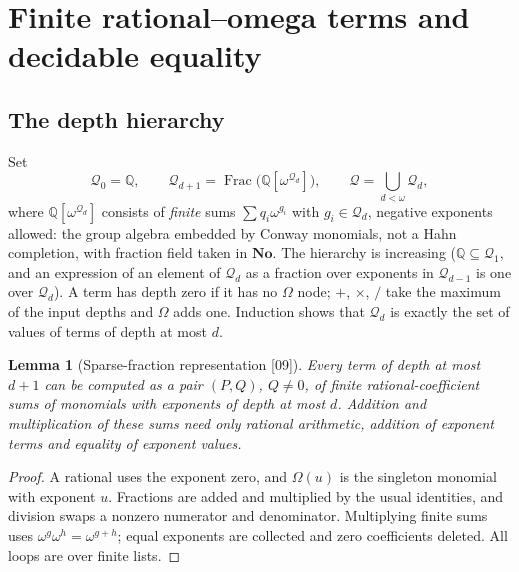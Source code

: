 \documentclass[11pt,oneside]{article}
\numberwithin{equation}{section}
\newtheorem{lemma}[lemma]{Lemma}
\theoremstyle{definition}
\theoremstyle{remark}
\newcommand{\No}{\mathbf{No}}
\newcommand{\Q}{\mathbb Q}
\newcommand{\QO}{\mathcal Q}
\newcommand{\Frac}{\operatorname{Frac}}
\newcommand{\Om}{\Omega}
\newcommand{\src}[1]{\textup{\textsf{\small[#1]}}}
\begin{document}
\section{Finite rational--omega terms and decidable equality}\label{onot:grid:sec:equality}

\subsection{The depth hierarchy}

Set
\begin{equation}\label{onot:grid:eq:hierarchy}
 \QO_0=\Q,\qquad \QO_{d+1}=\Frac\bigl(\Q[\omega^{\QO_d}]\bigr),\qquad \QO=\bigcup_{d<\omega}\QO_d,
\end{equation}
where $\Q[\omega^{\QO_d}]$ consists of \emph{finite} sums $\sum q_i\omega^{g_i}$
with $g_i\in\QO_d$, negative exponents allowed: the group algebra embedded by
Conway monomials, not a Hahn completion, with fraction field taken in $\No$. The
hierarchy is increasing ($\Q\subseteq\QO_1$, and an expression of an element of
$\QO_d$ as a fraction over exponents in $\QO_{d-1}$ is one over $\QO_d$). A term
has depth zero if it has no $\Om$ node; $+$, $\times$, $/$ take the maximum of the
input depths and $\Om$ adds one. Induction shows that $\QO_d$ is exactly the set
of values of terms of depth at most $d$.

\begin{lemma}[Sparse-fraction representation \src{09}]\label{onot:grid:lem:sparse}
Every term of depth at most $d+1$ can be computed as a pair $(P,Q)$, $Q\ne0$, of
finite rational-coefficient sums of monomials with exponents of depth at most $d$.
Addition and multiplication of these sums need only rational arithmetic, addition
of exponent terms and equality of exponent values.
\end{lemma}
\begin{proof}
A rational uses the exponent zero, and $\Om(u)$ is the singleton monomial with
exponent $u$. Fractions are added and multiplied by the usual identities, and
division swaps a nonzero numerator and denominator. Multiplying finite sums uses
$\omega^g\omega^h=\omega^{g+h}$; equal exponents are collected and zero
coefficients deleted. All loops are over finite lists.
\end{proof}
\end{document}
